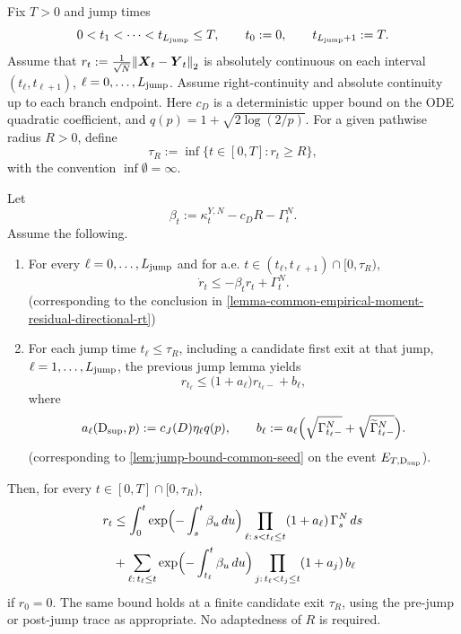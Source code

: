 \begin{lemma}
\label{lem:piecewise-gronwall-forced-jumps}
Fix $T>0$ and jump times
\[
0<t_1<\cdots<t_{L_{\mathrm{jump}}}\le T,
\qquad
t_0:=0,
\qquad
t_{L_{\mathrm{jump}}+1}:=T.
\]
Assume that $r_t:=\frac{1}{\sqrt N}\norm{\boldsymbol{X}_t-\boldsymbol{Y}_t}_2$
is absolutely continuous on each interval $(t_\ell,t_{\ell+1})$, $\ell=0,\dots,L_{\mathrm{jump}}$.
Assume right-continuity and absolute continuity up to each branch endpoint. Here $c_D$ is a deterministic upper bound on the ODE quadratic coefficient, and $q(p)=1+\sqrt{2\log(2/p)}$. For a given pathwise radius $R>0$, define
\[
\tau_R:=\inf\{t\in[0,T]: r_t\ge R\},
\]
with the convention $\inf\emptyset=\infty$.

Let
\[
\beta_t:=\kappa_t^{Y,N}-c_D R-\Gamma_t^N.
\]
Assume the following.

\begin{enumerate}
    \item For every $\ell=0,\dots,L_{\mathrm{jump}}$ and for a.e.
    $t\in (t_\ell,t_{\ell+1})\cap[0,\tau_R)$,
    \begin{equation}
    \label{eq:forced-ode-assumption-recursive}
    \dot r_t\le -\beta_t r_t+\Gamma_t^N.
    \end{equation}
    (corresponding to the conclusion in \cref{lemma-common-empirical-moment-residual-directional-rt})

    \item For each jump time $t_\ell\le\tau_R$, including a candidate first exit at that jump, $\ell=1,\dots,L_{\mathrm{jump}}$, the previous jump lemma yields
    \begin{equation}
    \label{eq:jump-recursion-assumption}
    r_{t_\ell}
    \le
    \bigl(1+a_\ell\bigr)r_{t_\ell-}+b_\ell,
    \end{equation}
    where
    \[
    a_\ell(\mathrm{D}_{\sup},p):=c_J(D)\eta_\ell q(p),
    \qquad
    b_\ell:=a_\ell\Bigl(\sqrt{\Gamma_{t_\ell-}^N}+\sqrt{\widetilde{\Gamma}_{t_\ell-}^N}\Bigr).
    \]
    (corresponding to \cref{lem:jump-bound-common-seed} on the event $E_{T,\mathrm{D}_{\sup}}$).
\end{enumerate}

Then, for every $t\in[0,T]\cap[0,\tau_R)$,
\begin{align}
\label{eq:piecewise-recursive-bound}
r_t
&\le
\int_0^t
\exp\Bigl(-\int_s^t \beta_u\,du\Bigr)
\prod_{\ell:\,s<t_\ell\le t}(1+a_\ell)\,
\Gamma_s^N\,ds\\
&+
\sum_{\ell:\,t_\ell\le t}
\exp\Bigl(-\int_{t_\ell}^t \beta_u\,du\Bigr)
\prod_{j:\,t_\ell<t_j\le t}(1+a_j)\,
b_\ell
\end{align}
if $r_0=0$. The same bound holds at a finite candidate exit $\tau_R$, using the pre-jump or post-jump trace as appropriate. No adaptedness of $R$ is required.
\end{lemma}

